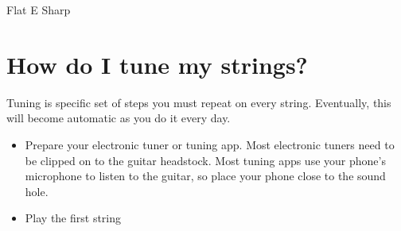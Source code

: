 {\large Flat} {\Huge E} {\large Sharp}







\section{How do I tune my strings?}

Tuning is specific set of steps you must repeat on every string. Eventually, this will become automatic as you do it every day.

\begin{itemize}
	\item Prepare your electronic tuner or tuning app. Most electronic tuners need to be clipped on to the guitar headstock. Most tuning apps use your phone's microphone to listen to the guitar, so place your phone close to the sound hole.
	\item Play the first string
\end{itemize}


